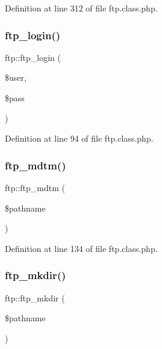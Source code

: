 Definition at line 312 of file ftp.\+class.\+php.

\mbox{\label{classftp_a59f3acaa1cdc8e828eeac35d87ff2b9d}} 
\subsubsection{\texorpdfstring{ftp\+\_\+login()}{ftp\_login()}}
{\footnotesize\ttfamily ftp\+::ftp\+\_\+login (\begin{DoxyParamCaption}\item[{}]{\$user,  }\item[{}]{\$pass }\end{DoxyParamCaption})}



Definition at line 94 of file ftp.\+class.\+php.

\mbox{\label{classftp_a1a50510c0717d4d869e9cb73be0bbe7d}} 
\subsubsection{\texorpdfstring{ftp\+\_\+mdtm()}{ftp\_mdtm()}}
{\footnotesize\ttfamily ftp\+::ftp\+\_\+mdtm (\begin{DoxyParamCaption}\item[{}]{\$pathname }\end{DoxyParamCaption})}



Definition at line 134 of file ftp.\+class.\+php.

\mbox{\label{classftp_a68c762768c22eec736e8d86b9d068287}} 
\subsubsection{\texorpdfstring{ftp\+\_\+mkdir()}{ftp\_mkdir()}}
{\footnotesize\ttfamily ftp\+::ftp\+\_\+mkdir (\begin{DoxyParamCaption}\item[{}]{\$pathname }\end{DoxyParamCaption})}



